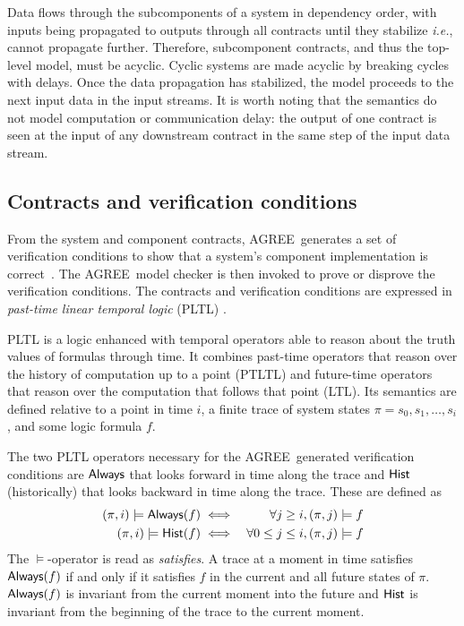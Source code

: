 \documentclass[global,twocolumn]{svjour}
\newcommand{\agr}{AGREE}
\newcommand{\ie}{\textit{i.e.}}
\begin{document}
Data flows through the subcomponents of a system in dependency order, with inputs being propagated to outputs through all contracts until they stabilize \ie, cannot propagate further.
%
Therefore, subcomponent contracts, and thus the top-level model, must be acyclic.
%
Cyclic systems are made acyclic by breaking cycles with delays.
%
Once the data propagation has stabilized, the model proceeds to the next input data in the input streams.
%
It is worth noting that the semantics do not model computation or communication delay: the output of one contract is seen at the input of any downstream contract in the same step of the input data stream.


\subsection{Contracts and verification conditions}

From the system and component contracts, \agr\ generates a set of verification conditions to show that a system's component implementation is correct~\cite{agree2013}.
%
The \agr\ model checker is then invoked to prove or disprove the verification conditions.
%
The contracts and verification conditions are expressed in \emph{past-time linear temporal logic} (PLTL) \cite{10.1093/jigpal/8.1.55}.

PLTL is a logic enhanced with temporal operators able to reason about the truth values of formulas through time.
%
It combines past-time operators that reason over the history of computation up to a point (PTLTL) and future-time operators that reason over the computation that follows that point (LTL).
%
Its semantics are defined relative to a point in time $i$, a finite trace of system states $\pi = s_0, s_1, \ldots, s_i$, and some logic formula $f$.

The two PLTL operators necessary for the \agr\ generated verification conditions are $\mathsf{Always}$ that looks forward in time along the trace and $\mathsf{Hist}$ (historically) that looks backward in time along the trace.
%
These are defined as
%
\begin{eqnarray*}
 (\pi, i) \models \mathsf{Always}(f) & \iff & \forall j \ge i, (\pi, j) \models f \\
(\pi, i) \models \mathsf{Hist}(f) & \iff & \forall 0 \le j \le i, (\pi, j) \models f
\end{eqnarray*}
%
The $\models$-operator is read as \emph{satisfies}.
%
A trace at a moment in time satisfies $\mathsf{Always}(f)$ if and only if it satisfies $f$ in the current and all future states of $\pi$.
%
$\mathsf{Always}(f)$ is invariant from the current moment into the future and $\mathsf{Hist}$ is invariant from the beginning of the trace to the current moment.
\end{document}
